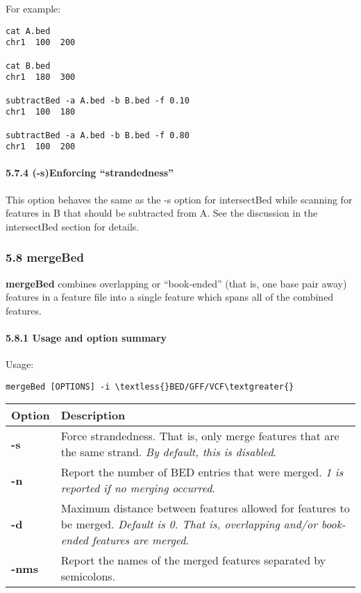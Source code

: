 \documentclass[letterpaper,10pt,english]{sphinxmanual}
\begin{document}
For example:

\begin{Verbatim}[commandchars=\\\{\}]
cat A.bed
chr1  100  200

cat B.bed
chr1  180  300

subtractBed -a A.bed -b B.bed -f 0.10
chr1  100  180

subtractBed -a A.bed -b B.bed -f 0.80
chr1  100  200
\end{Verbatim}


\paragraph{5.7.4 (-s)Enforcing ``strandedness''}
\label{content/subtractBed:s-enforcing-strandedness}
This option behaves the same as the -s option for intersectBed while scanning for features in B that
should be subtracted from A. See the discussion in the intersectBed section for details.


\subsubsection{5.8 mergeBed}
\label{content/mergeBed:mergebed}\label{content/mergeBed::doc}
\textbf{mergeBed} combines overlapping or ``book-ended'' (that is, one base pair away) features in a feature file
into a single feature which spans all of the combined features.


\paragraph{5.8.1 Usage and option summary}
\label{content/mergeBed:usage-and-option-summary}
Usage:

\begin{Verbatim}[commandchars=\\\{\}]
mergeBed [OPTIONS] -i \textless{}BED/GFF/VCF\textgreater{}
\end{Verbatim}

\begin{tabulary}{\linewidth}{|L|L|}
\hline
\textbf{
Option
} & \textbf{
Description
}\\\hline

\textbf{-s}
 & 
Force strandedness. That is, only merge features that are the same strand. \emph{By default, this is disabled}.
\\\hline

\textbf{-n}
 & 
Report the number of BED entries that were merged. \emph{1 is reported if no merging occurred}.
\\\hline

\textbf{-d}
 & 
Maximum distance between features allowed for features to be merged. \emph{Default is 0. That is, overlapping and/or book-ended features are merged}.
\\\hline

\textbf{-nms}
 & 
Report the names of the merged features separated by semicolons.
\\\hline
\end{tabulary}
\end{document}
